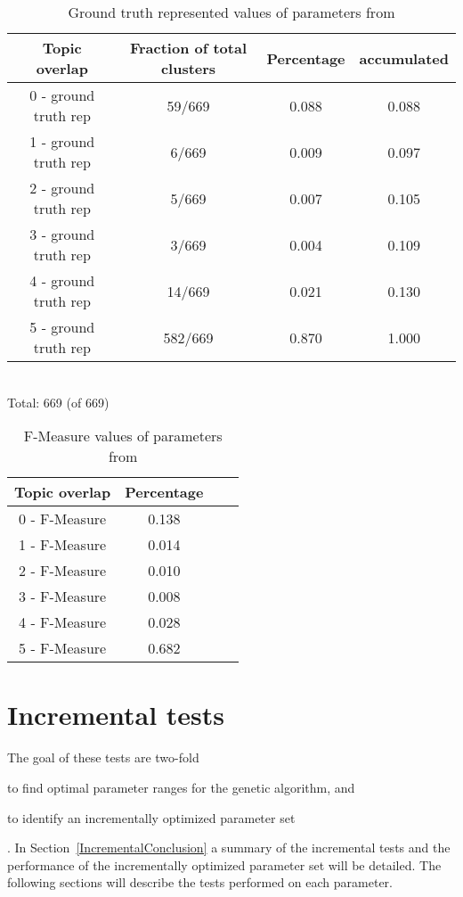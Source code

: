 \begin{table}
\begin{center}
\begin{tabular}{|c|c|c|c|}
\hline
Topic overlap &  Fraction of total clusters & Percentage  & accumulated\\ 
\hline
0 - ground truth rep & 59/669  & 0.088 & 0.088\\
1 - ground truth rep & 6/669   & 0.009 & 0.097\\
2 - ground truth rep & 5/669   & 0.007 & 0.105\\
3 - ground truth rep & 3/669   & 0.004 & 0.109\\
4 - ground truth rep & 14/669  & 0.021 & 0.130\\
5 - ground truth rep & 582/669 & 0.870 & 1.000\\
\hline
\end{tabular}
\\Total: 669 (of  669)
\end{center}
\caption{Ground truth represented values of parameters from \citeauthor{Oren1998}}
\label{tab:etzioniparametersgroundtruthrep}
\end{table}

\begin{table}
\begin{center}
\begin{tabular}{|c|c|c|c|}
\hline
Topic overlap & Percentage\\ 
\hline
0 - F-Measure & 0.138\\
1 - F-Measure & 0.014\\
2 - F-Measure & 0.010\\
3 - F-Measure & 0.008\\
4 - F-Measure & 0.028\\
5 - F-Measure & 0.682\\
\hline
\end{tabular}
\end{center}
\caption{F-Measure values of parameters from \citeauthor{Oren1998}}
\label{tab:etzioniparametersfmeasure}
\end{table}

\section{Incremental tests}

The goal of these tests are two-fold
\begin{inparaenum}[\itshape 1\upshape)]
\item to find optimal parameter ranges for the genetic algorithm, and
\item to identify an incrementally optimized parameter set
\end{inparaenum}.
In Section~\ref{IncrementalConclusion} a summary of the incremental tests and the performance of the incrementally optimized parameter set will be detailed. The following sections will describe the tests performed on each parameter.

